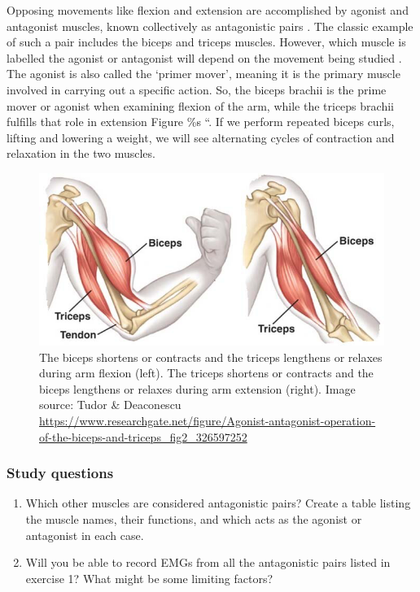 \documentclass{article}
\begin{document}
Opposing movements like flexion and extension are accomplished by agonist and antagonist muscles, known collectively as antagonistic pairs \citep{tortora2018principles}. The classic example of such a pair includes the biceps and triceps muscles. However, which muscle is labelled the agonist or antagonist will depend on the movement being studied \citep{openStax_lever}. The agonist is also called the `primer mover', meaning it is the primary muscle involved in carrying out a specific action. So, the biceps brachii is the prime mover or agonist when examining flexion of the arm, while the triceps brachii fulfills that role in extension \citep{}Figure \%s ``. If we perform repeated biceps curls, lifting and lowering a weight, we will see alternating cycles of contraction and relaxation in the two muscles.

\begin{figure}[!htbp]
\centering
\includegraphics[width=0.7\linewidth]{files/EPpXta8zJdzN048lz8AR-ec2526a5cac2199f7f2eea233f76c576.png}
\caption[]{The biceps shortens or contracts and the triceps lengthens or relaxes during arm flexion (left). The triceps shortens or contracts and the biceps lengthens or relaxes during arm extension (right). Image source: Tudor \& Deaconescu \href{https://www.researchgate.net/figure/Agonist-antagonist-operation-of-the-biceps-and-triceps\_fig2\_326597252}{https://www.researchgate.net/figure/Agonist-antagonist-operation-of-the-biceps-and-triceps\_fig2\_326597252}}
\label{oxikRm83EQ}
\end{figure}

\subsubsection{Study questions}

\begin{enumerate}
\item Which other muscles are considered antagonistic pairs? Create a table listing the muscle names, their functions, and which acts as the agonist or antagonist in each case.
\item Will you be able to record EMGs from all the antagonistic pairs listed in exercise 1? What might be some limiting factors?
\end{enumerate}
\end{document}
